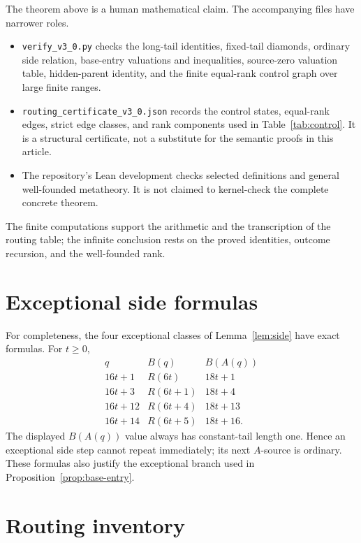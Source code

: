 The theorem above is a human mathematical claim. The accompanying files have
narrower roles.
\begin{itemize}[leftmargin=*]
\item \texttt{verify\_v3\_0.py} checks the long-tail identities, fixed-tail
      diamonds, ordinary side relation, base-entry valuations and inequalities,
      source-zero valuation table, hidden-parent identity, and the finite
      equal-rank control graph over large finite ranges.
\item \texttt{routing\_certificate\_v3\_0.json} records the control states,
      equal-rank edges, strict edge classes, and rank components used in
      Table~\ref{tab:control}. It is a structural certificate, not a substitute
      for the semantic proofs in this article.
\item The repository's Lean development checks selected definitions and
      general well-founded metatheory. It is not claimed to kernel-check the
      complete concrete theorem.
\end{itemize}

The finite computations support the arithmetic and the transcription of the
routing table; the infinite conclusion rests on the proved identities,
outcome recursion, and the well-founded rank.

\appendix
\section{Exceptional side formulas}\label{app:exceptional}

For completeness, the four exceptional classes of Lemma~\ref{lem:side} have
exact formulas. For $t\ge0$,
\[
\begin{array}{c|c|c}
q&B(q)&B(A(q))\\ \hline
16t+1  &R(6t)   &18t+1\\
16t+3  &R(6t+1) &18t+4\\
16t+12 &R(6t+4) &18t+13\\
16t+14 &R(6t+5) &18t+16.
\end{array}
\]
The displayed $B(A(q))$ value always has constant-tail length one. Hence an
exceptional side step cannot repeat immediately; its next $A$-source is
ordinary. These formulas also justify the exceptional branch used in
Proposition~\ref{prop:base-entry}.

\section{Routing inventory}\label{app:routing}


